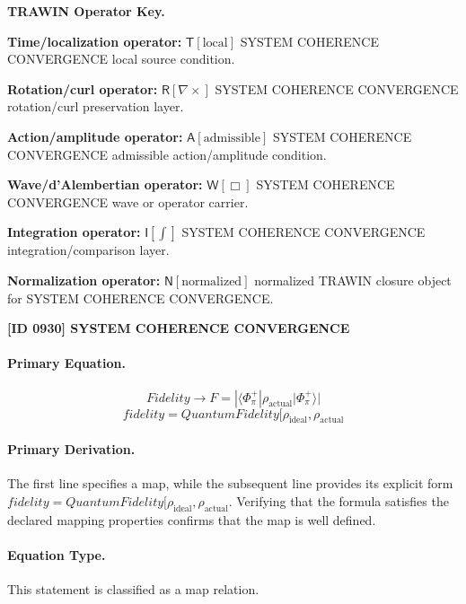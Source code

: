 \par\vspace{0.45\baselineskip}
\noindent\begin{minipage}[t]{\linewidth}
\begingroup
\small
\raggedright
\textbf{TRAWIN Operator Key.}\par
\noindent\textbf{Time/localization operator:} $\mathsf{T}\!\left[\mathrm{local}\right]$ SYSTEM COHERENCE CONVERGENCE local source condition.\par
\noindent\textbf{Rotation/curl operator:} $\mathsf{R}\!\left[\nabla\times\right]$ SYSTEM COHERENCE CONVERGENCE rotation/curl preservation layer.\par
\noindent\textbf{Action/amplitude operator:} $\mathsf{A}\!\left[\mathrm{admissible}\right]$ SYSTEM COHERENCE CONVERGENCE admissible action/amplitude condition.\par
\noindent\textbf{Wave/d'Alembertian operator:} $\mathsf{W}\!\left[\Box\right]$ SYSTEM COHERENCE CONVERGENCE wave or operator carrier.\par
\noindent\textbf{Integration operator:} $\mathsf{I}\!\left[\int\right]$ SYSTEM COHERENCE CONVERGENCE integration/comparison layer.\par
\noindent\textbf{Normalization operator:} $\mathsf{N}\!\left[\mathrm{normalized}\right]$ normalized TRAWIN closure object for SYSTEM COHERENCE CONVERGENCE.\par
\endgroup
\end{minipage}

\clearpage
\noindent\textbf{[ID 0930] SYSTEM COHERENCE CONVERGENCE}\par
\vspace{0.35em}
\paragraph{Primary Equation.}
\[
Fidelity \to F = |\langle\Phi_\pi^+|\rho_{\mathrm{actual}}\lvert \Phi_\pi^+ \rangle|
\]
\[
fidelity = QuantumFidelity[\rho_{\mathrm{ideal}}, \rho_{\mathrm{actual}}
\]

\paragraph{Primary Derivation.}
The first line specifies a map, while the subsequent line provides its explicit form \( fidelity = QuantumFidelity[\rho_{\mathrm{ideal}}, \rho_{\mathrm{actual}} \). Verifying that the formula satisfies the declared mapping properties confirms that the map is well defined.
\paragraph{Equation Type.}
This statement is classified as a map relation.

